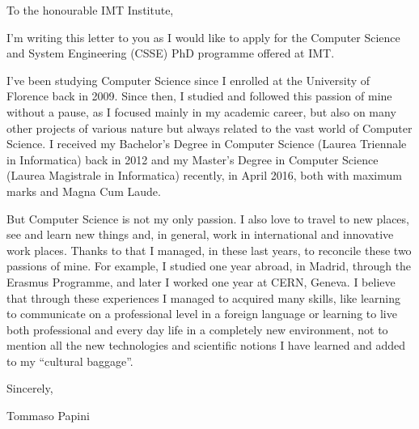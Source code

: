 \documentclass{article}
\begin{document}
    \hspace*{0.5\linewidth}
    
    To the honourable IMT Institute, \par \bigskip
    
    I'm writing this letter to you as I would like to apply for the Computer Science and System
    Engineering (CSSE) PhD programme offered at IMT. \par \bigskip
    
    I've been studying Computer Science since I enrolled at the University of Florence back in 2009. Since then, I studied and followed this passion of mine without a pause, as I focused mainly in my academic career, but also on many other projects of various nature but always related to the vast world of Computer Science. I received my Bachelor's Degree in Computer Science (Laurea Triennale in Informatica) back in 2012 and my Master's Degree in Computer Science (Laurea Magistrale in Informatica) recently, in April 2016, both with maximum marks and Magna Cum Laude. \par \bigskip
    
    But Computer Science is not my only passion. I also love to travel to new places, see and learn new things and, in general, work in international and innovative work places. Thanks to that I managed, in these last years, to reconcile these two passions of mine. For example, I studied one year abroad, in Madrid, through the Erasmus Programme, and later I worked one year at CERN, Geneva. I believe that through these experiences I managed to acquired many skills, like learning to communicate on a professional level in a foreign language or learning to live both professional and every day life in a completely new environment, not to mention all the new technologies and scientific notions I have learned and added to my ``cultural baggage''.\par \bigskip
    
    Sincerely, \par \medskip
    
    \qquad \qquad Tommaso Papini
\end{document}
